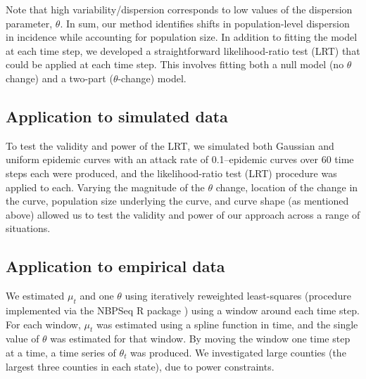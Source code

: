 \documentclass[10pt,letterpaper]{article}
\begin{document}
Note that high variability/dispersion corresponds to low values of the dispersion parameter, \begin{math}\theta\end{math}.
In sum, our method identifies shifts in population-level dispersion in incidence while accounting for population size. 
In addition to fitting the model at each time step, we developed a straightforward likelihood-ratio test (LRT) that could be applied at each time step. This involves fitting both a null model (no \begin{math}\theta\end{math} change) and a two-part (\begin{math}\theta\end{math}-change) model.

\subsection*{Application to simulated data}

To test the validity and power of the LRT, we simulated both Gaussian and uniform epidemic curves with an attack rate of 0.1--epidemic curves over 60 time steps each were produced, and the likelihood-ratio test (LRT) procedure was applied to each. 
Varying the magnitude of the \begin{math}\theta\end{math} change, location of the change in the curve, population size underlying the curve, and curve shape (as mentioned above) allowed us to test the validity and power of our approach across a range of situations.

\subsection*{Application to empirical data}
We estimated \begin{math}\mu_t\end{math} and one \begin{math}\theta\end{math} using iteratively reweighted least-squares (procedure implemented via the NBPSeq R package \cite{NBPSeq}) using a window around each time step.
For each window, \begin{math}\mu_t\end{math} was estimated using a spline function in time, and the single value of \begin{math}\theta\end{math} was estimated for that window. 
By moving the window one time step at a time, a time series of \begin{math}\theta_t\end{math} was produced. We investigated large counties (the largest three counties in each state), due to power constraints.
\end{document}
